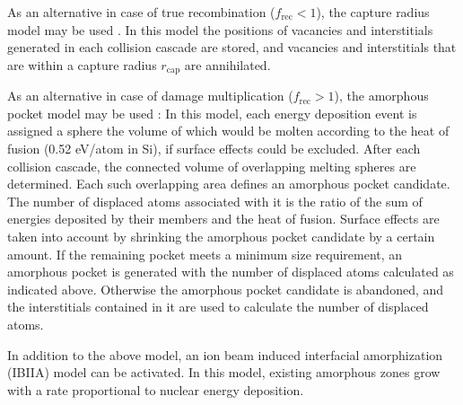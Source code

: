 As an alternative in case of true recombination ($f_\mathrm{rec} < 1$), the
capture radius model may be used \cite{simionescu_comparison_1995}. In this
model the positions of vacancies and interstitials generated in each collision
cascade are stored, and vacancies and interstitials that are within a capture
radius $r_\mathrm{cap}$ are annihilated. 

As an alternative in case of damage multiplication ($f_\mathrm{rec} > 1$), the
amorphous pocket model may be used \cite{hobler_amorphous_2003}: In this
model, each energy deposition event is assigned a sphere the volume of which
would be molten according to the heat of fusion (0.52 eV/atom in Si), if surface
effects could be excluded. After each collision cascade, the connected volume
of overlapping melting spheres are determined. Each such overlapping area deﬁnes
an amorphous pocket candidate. The number of displaced atoms associated with it 
is the ratio of the sum of energies deposited by their members and the heat
of fusion. Surface effects are taken into account by shrinking the amorphous 
pocket candidate by a certain amount. If the remaining pocket meets a minimum 
size requirement, an amorphous pocket is generated with the number of displaced 
atoms calculated as indicated above. Otherwise the amorphous pocket candidate is
abandoned, and the interstitials contained in it are used to calculate the
number of displaced atoms. 

In addition to the above model, an ion beam induced interfacial amorphization
(IBIIA) model \cite{I9766} can be activated. In this model, existing amorphous
zones grow with a rate proportional to nuclear energy deposition.

